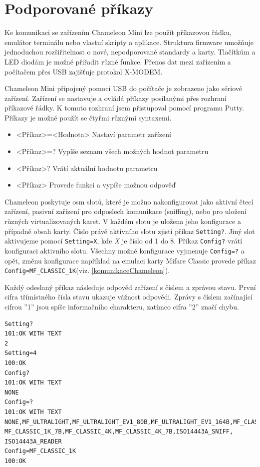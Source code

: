 \section{Podporované příkazy}
Ke komunikaci se zařízením Chameleon Mini lze použít příkazovou řádku, emulátor terminálu nebo vlastní skripty a aplikace. Struktura firmware umožňuje jednoduchou rozšiřitelnost o nové, nepodporované standardy a karty. Tlačítkům a LED diodám je možné přiřadit různé funkce. Přenos dat mezi zařízením a počítačem přes USB zajišťuje protokol {X-MODEM}. \cite{ChameleonKickStarter}
\par
Chameleon Mini připojený pomocí USB do počítače je zobrazeno jako sériové zařízení. Zařízení se nastavuje a ovládá příkazy posílanými přes rozhraní příkazové řádky. K tomuto rozhraní jsem přistupoval pomocí programu Putty. Příkazy je možné použít se čtyřmi různými syntaxemi.
\begin{itemize}
  \item <Příkaz>=<Hodnota> Nastaví parametr zařízení
  \item <Příkaz>=? Vypíše seznam všech možných hodnot parametru
  \item <Příkaz>? Vrátí aktuální hodnotu parametru
  \item <Příkaz> Provede funkci a vypíše možnou odpověď
\end{itemize}
Chameleon poskytuje osm slotů, které je možno nakonfigurovat jako aktivní čtecí zařízení, pasivní zařízení pro odposlech komunikace (sniffing), nebo pro uložení různých virtualizovaných karet. V každém slotu je uložena jeho konfigurace a případně obsah karty. Číslo právě aktivního slotu zjistí příkaz \verb|Setting?|. Jiný slot aktivujeme pomocí \verb|Setting=X|, kde \emph{X} je číslo od 1 do 8. Příkaz \verb|Config?| vrátí konfiguraci aktivního slotu. Všechny možné konfigurace vyjmenuje \verb|Config=?| a opět, změnu konfigurace například na emulaci karty Mifare Classic provede příkaz \verb|Config=MF_CLASSIC_1K|(viz. \ref{komunikaceChameleon}). \par 
Každý odeslaný příkaz následuje odpověď zařízení s číslem a zprávou stavu. První cifra třímístného čísla stavu ukazuje vážnost odpovědi. Zprávy s číslem začínající cifrou ''1'' jsou spíše  informačního charakteru, zatímco cifra ''2'' značí chybu.\cite{ChameleonDocs}

\begin{lstlisting}[caption=Záznam komunikace se zařízením Chameleon Mini, label={komunikaceChameleon}]
Setting?
101:OK WITH TEXT
2
Setting=4
100:OK
Config?
101:OK WITH TEXT
NONE
Config=?
101:OK WITH TEXT
NONE,MF_ULTRALIGHT,MF_ULTRALIGHT_EV1_80B,MF_ULTRALIGHT_EV1_164B,MF_CLASSIC_1K,
MF_CLASSIC_1K_7B,MF_CLASSIC_4K,MF_CLASSIC_4K_7B,ISO14443A_SNIFF,
ISO14443A_READER
Config=MF_CLASSIC_1K
100:OK
\end{lstlisting}

